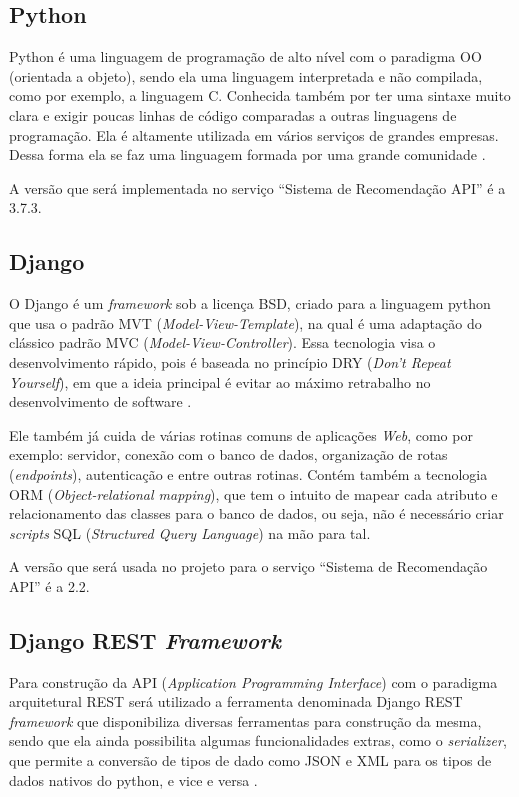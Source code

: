 \subsection{Python}

Python é uma linguagem de programação de alto nível com o paradigma OO (orientada a objeto), sendo ela uma linguagem interpretada e não compilada, como por exemplo, a linguagem C. Conhecida também por ter uma sintaxe muito clara e exigir poucas linhas de código comparadas a outras linguagens de programação. Ela é altamente utilizada em vários serviços de grandes empresas. Dessa forma ela se faz uma linguagem formada por uma grande comunidade \cite{Python:2019}.

A versão que será implementada no serviço “Sistema de Recomendação API” é a 3.7.3.

\subsection{Django}

O Django é um \textit{framework} sob a licença BSD, criado para a linguagem python que usa o padrão MVT (\textit{Model-View-Template}), na qual é uma adaptação do clássico padrão MVC (\textit{Model-View-Controller}). Essa tecnologia visa o desenvolvimento rápido, pois é baseada no princípio  DRY (\textit{Don’t Repeat Yourself}), em que a ideia principal é evitar ao máximo retrabalho no desenvolvimento de software \cite{Django:2019}.

Ele também já cuida de várias rotinas comuns de aplicações \textit{Web}, como por exemplo: servidor, conexão com o banco de dados, organização de rotas (\textit{endpoints}), autenticação e entre outras rotinas. Contém também a tecnologia ORM (\textit{Object-relational mapping}), que tem o intuito de mapear cada atributo e relacionamento das classes para o banco de dados, ou seja, não é necessário criar \textit{scripts} SQL (\textit{Structured Query Language}) na mão para tal. 

A versão que será usada no projeto para o serviço “Sistema de Recomendação API” é a 2.2.

\subsection{Django REST \textit{Framework}}

Para construção da API (\textit{Application Programming Interface}) com o paradigma arquitetural REST será utilizado a ferramenta denominada Django REST \textit{framework} que disponibiliza diversas ferramentas para construção da mesma, sendo que ela ainda possibilita algumas funcionalidades extras, como o \textit{serializer}, que permite a conversão de tipos de dado como JSON e XML para os tipos de dados nativos do python, e vice e versa \cite{DjangoRest:2019}.

